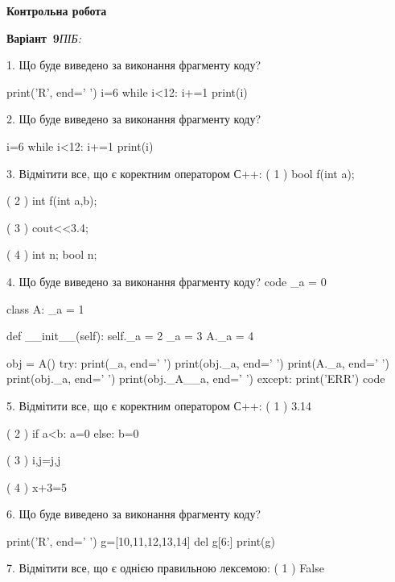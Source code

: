 \documentclass[11pt]{article}
\begin{document}
{\large\textbf{Контрольна робота}}

\textbf{Варіант \No\,9}\hfill \textit{ПІБ:}\,\underline{\hspace{60mm}}
\vspace{4mm}

1. Що буде виведено за виконання фрагменту коду?

print('R', end=' ')
i=6
while i<12:
    i+=1
print(i)

\vspace{5mm}

2. Що буде виведено за виконання фрагменту коду?

i=6
while i<12:
    i+=1
print(i)

\vspace{5mm}

3. %
Відмітити все, що є коректним оператором С++:
( 1 ) bool f(int a);

( 2 ) int f(int a,b);

( 3 ) cout<<3.4;

( 4 ) int n; bool n;
\vspace{5mm}

4. Що буде виведено за виконання фрагменту коду?
code
_a = 0

class A:
    _a = 1
    
    def __init__(self):
        self._a = 2
        _a = 3
        A._a = 4

obj = A()
try:
    print(_a, end=' ')
    print(obj._a, end=' ')
    print(A._a, end=' ')
    print(obj._a, end=' ')
    print(obj._A__a, end=' ')
except:
    print('ERR')
code
\vspace{5mm}

5. %
Відмітити все, що є коректним оператором С++:
( 1 ) 3.14%

( 2 ) if a<b: a=0 else: b=0

( 3 ) i,j=j,j

( 4 ) x+3=5
\vspace{5mm}

6. Що буде виведено за виконання фрагменту коду?

print('R', end=' ')
g=[10,11,12,13,14]
del g[6:]
print(g)

\vspace{5mm}

7. %
Відмітити все, що є однією правильною лексемою:
( 1 ) False
\end{document}
